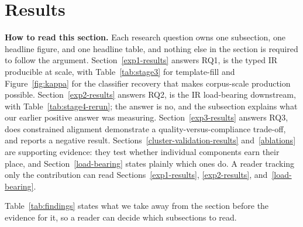 \documentclass[sigconf, anonymous]{acmart}
\begin{document}
\section{Results}\label{results}

\textbf{How to read this section.} Each research question owns one subsection, one headline
figure, and one headline table, and nothing else in the section is required to follow the
argument. Section~\ref{exp1-results} answers RQ1, is the typed IR producible at scale, with
Table~\ref{tab:stage3} for template-fill and Figure~\ref{fig:kappa} for the classifier recovery
that makes corpus-scale production possible. Section~\ref{exp2-results} answers RQ2, is the IR
load-bearing downstream, with Table~\ref{tab:stage4-rerun}; the answer is no, and the subsection explains what our earlier positive answer was measuring.
Section~\ref{exp3-results} answers RQ3, does constrained alignment demonstrate a
quality-versus-compliance trade-off, and reports a negative result.
Sections~\ref{cluster-validation-results} and~\ref{ablations} are supporting evidence: they test
whether individual components earn their place, and Section~\ref{load-bearing} states plainly
which ones do. A reader tracking only the contribution can read
Sections~\ref{exp1-results}, \ref{exp2-results}, and~\ref{load-bearing}.

Table~\ref{tab:findings} states what we take away from the section before the evidence for it,
so a reader can decide which subsections to read.
\end{document}
